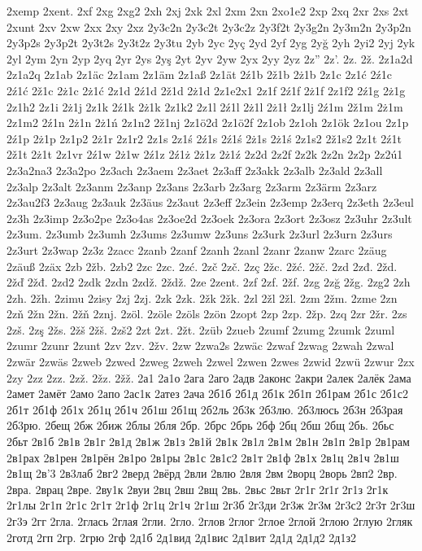 2xemp
2xent.
2xf
2xg
2xg2
2xh
2xj
2xk
2xl
2xm
2xn
2xo1e2
2xp
2xq
2xr
2xs
2xt
2xunt
2xv
2xw
2xx
2xy
2xz
2y3c2n
2y3c2t
2y3c2z
2y3f2t
2y3g2n
2y3m2n
2y3p2n
2y3p2s
2y3p2t
2y3t2s
2y3t2z
2y3tu
2yb
2yc
2yç
2yd
2yf
2yg
2yğ
2yh
2yi2
2yj
2yk
2yl
2ym
2yn
2yp
2yq
2yr
2ys
2yş
2yt
2yv
2yw
2yx
2yy
2yz
2z''
2z'.
2z.
2ž.
2z1a2d
2z1a2q
2z1ab
2z1äc
2z1am
2z1äm
2z1aß
2z1ät
2ź1b
2ž1b
2ż1b
2z1c
2z1ć
2ź1c
2ź1ć
2ž1c
2ż1c
2ż1ć
2z1d
2ź1d
2ž1d
2ż1d
2z1e2x1
2z1f
2ź1f
2ż1f
2z1f2
2ź1g
2ż1g
2z1h2
2z1i
2ż1j
2z1k
2ź1k
2ż1k
2z1k2
2z1l
2ź1l
2ż1l
2ż1ł
2z1lj
2ź1m
2ž1m
2ż1m
2z1m2
2ź1n
2ż1n
2ż1ń
2z1n2
2ž1nj
2z1ö2d
2z1ö2f
2z1ob
2z1oh
2z1ök
2z1ou
2z1p
2ź1p
2ż1p
2z1p2
2ż1r
2z1r2
2z1s
2z1ś
2ź1s
2ź1ś
2ż1s
2ż1ś
2z1s2
2ž1s2
2z1t
2ź1t
2ž1t
2ż1t
2z1vr
2ź1w
2ż1w
2ź1z
2ź1ż
2ż1z
2ż1ź
2z2d
2z2f
2z2k
2z2n
2z2p
2z2ú1
2z3a2na3
2z3a2po
2z3ach
2z3aem
2z3aet
2z3aff
2z3akk
2z3alb
2z3ald
2z3all
2z3alp
2z3alt
2z3anm
2z3anp
2z3ans
2z3arb
2z3arg
2z3arm
2z3ärm
2z3arz
2z3au2f3
2z3aug
2z3auk
2z3äus
2z3aut
2z3eff
2z3ein
2z3emp
2z3erq
2z3eth
2z3eul
2z3h
2z3imp
2z3o2pe
2z3o4as
2z3oe2d
2z3oek
2z3ora
2z3ort
2z3osz
2z3uhr
2z3ult
2z3um.
2z3umb
2z3umh
2z3ums
2z3umw
2z3uns
2z3urk
2z3url
2z3urn
2z3urs
2z3urt
2z3wap
2z3z
2zacc
2zanb
2zanf
2zanh
2zanl
2zanr
2zanw
2zarc
2zäug
2zäuß
2zäx
2zb
2žb.
2zb2
2zc
2zc.
2zć.
2zč
2zč.
2zç
2žc.
2žć.
2žč.
2zd
2zđ.
2žd.
2žď
2žđ.
2zd2
2zdk
2zdn
2zdž.
2ždž.
2ze
2zent.
2zf
2zf.
2žf.
2zg
2zğ
2žg.
2zg2
2zh
2zh.
2žh.
2zimu
2zisy
2zj
2zj.
2zk
2zk.
2žk
2žk.
2zl
2žl
2žl.
2zm
2žm.
2zme
2zn
2zň
2žn
2žn.
2žň
2znj.
2zöl.
2zöle
2zöls
2zön
2zopt
2zp
2zp.
2žp.
2zq
2zr
2žr.
2zs
2zš.
2zş
2žs.
2žš
2žš.
2zš2
2zt
2zt.
2žt.
2züb
2zueb
2zumf
2zumg
2zumk
2zuml
2zumr
2zunr
2zunt
2zv
2zv.
2žv.
2zw
2zwa2s
2zwäc
2zwaf
2zwag
2zwah
2zwal
2zwär
2zwäs
2zweb
2zwed
2zweg
2zweh
2zwel
2zwen
2zwes
2zwid
2zwü
2zwur
2zx
2zy
2zz
2zz.
2zž.
2žz.
2žž.
2а1
2а1о
2ага
2аго
2адв
2аконс
2акри
2алек
2алёк
2ама
2амет
2амёт
2амо
2апо
2ас1к
2атез
2ача
2б1б
2б1д
2б1к
2б1п
2б1рам
2б1с
2б1с2
2б1т
2б1ф
2б1х
2б1ц
2б1ч
2б1ш
2б1щ
2б2ль
2б3к
2б3лю.
2б3люсь
2б3н
2б3рая
2б3рю.
2бещ
2бж
2биж
2блы
2бля
2бр.
2брс
2брь
2бф
2бц
2бш
2бщ
2бь.
2бьс
2бьт
2в1б
2в1в
2в1г
2в1д
2в1ж
2в1з
2в1й
2в1к
2в1л
2в1м
2в1н
2в1п
2в1р
2в1рам
2в1рах
2в1рен
2в1рён
2в1ро
2в1ры
2в1с
2в1с2
2в1т
2в1ф
2в1х
2в1ц
2в1ч
2в1ш
2в1щ
2в'3
2в3лаб
2вг2
2верд
2вёрд
2вли
2влю
2вля
2вм
2ворц
2ворь
2вп2
2вр.
2вра.
2врац
2вре.
2ву1к
2вуи
2вц
2вш
2вщ
2вь.
2вьс
2вьт
2г1г
2ґ1ґ
2г1з
2г1к
2г1лы
2г1п
2г1с
2г1т
2г1ф
2г1ц
2г1ч
2г1ш
2г3б
2г3ди
2г3ж
2г3м
2г3с2
2г3т
2г3ш
2г3э
2гг
2гла.
2глась
2глая
2гли.
2гло.
2глов
2глог
2глое
2глой
2глою
2глую
2гляк
2готд
2гп
2гр.
2грю
2гф
2д1б
2д1вид
2д1вис
2д1вит
2д1д
2д1д2
2д1з2
